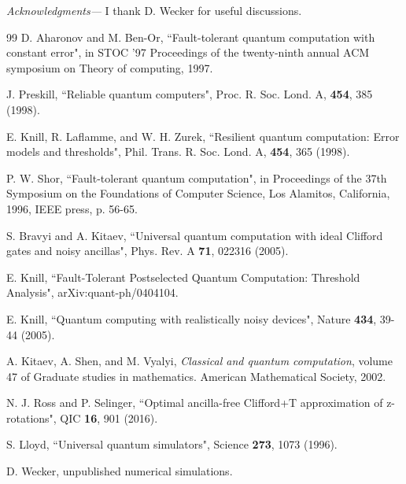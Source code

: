 \documentclass[aps,prl,amsmath,amssymb,amsfonts,superscriptaddress,floatfix]{revtex4}
\begin{document}
{\it Acknowledgments---} I thank D. Wecker for useful discussions.
\begin{thebibliography}{99}
  D. Aharonov and M. Ben-Or, ``Fault-tolerant quantum computation with constant error", in STOC '97 Proceedings of the twenty-ninth annual ACM symposium on Theory of computing, 1997.

 J. Preskill, ``Reliable quantum computers", Proc. R. Soc. Lond. A, {\bf 454}, 385 (1998).

 E. Knill, R. Laflamme, and W. H. Zurek, ``Resilient
quantum computation: Error models and thresholds", Phil.
Trans. R. Soc. Lond. A, {\bf 454}, 365 (1998).

 P. W. Shor, ``Fault-tolerant quantum computation", in Proceedings of the 37th Symposium on the Foundations of Computer Science, Los Alamitos, California, 1996, IEEE press, p. 56-65.

 S. Bravyi and A. Kitaev, ``Universal quantum computation with ideal Clifford gates and noisy ancillas", Phys. Rev. A {\bf 71}, 022316 (2005).

 E. Knill, ``Fault-Tolerant Postselected Quantum Computation: Threshold Analysis", arXiv:quant-ph/0404104.

 E. Knill, ``Quantum computing with realistically noisy devices",  Nature {\bf 434}, 39-44 (2005).

 A. Kitaev, A. Shen, and M. Vyalyi, {\it Classical and quantum computation}, volume 47 of Graduate
studies in mathematics. American Mathematical Society, 2002.

 N. J. Ross and P. Selinger, ``Optimal ancilla-free Clifford+T approximation of z-rotations",  QIC  {\bf 16}, 901 (2016).

 S. Lloyd, ``Universal quantum simulators", Science {\bf 273}, 1073 (1996).

 D. Wecker, unpublished numerical simulations.
\end{thebibliography}
\appendix
\end{document}
